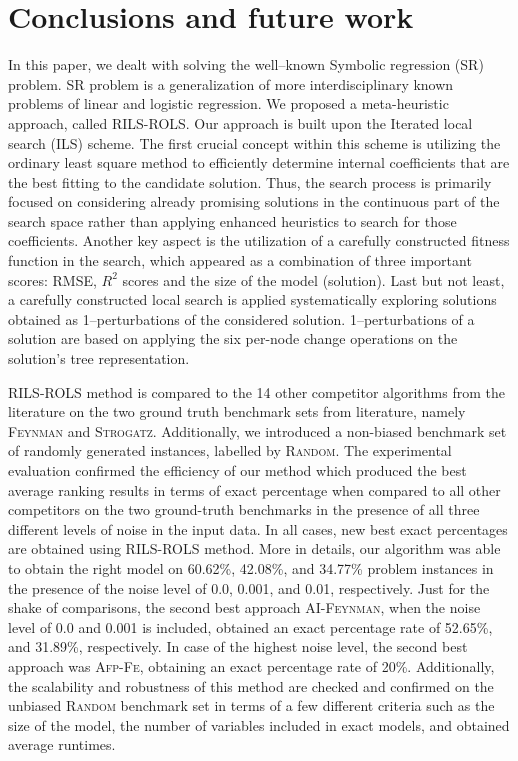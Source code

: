 \documentclass[a4paper,12pt]{elsarticle}
\begin{document}
\section{Conclusions and future work}\label{sec:conclusions}

In this paper, we dealt with solving the well--known Symbolic regression (SR)  problem. SR problem is a generalization of more interdisciplinary known problems of linear and logistic regression.    
We proposed a meta-heuristic approach, called \textsc{RILS}-\textsc{ROLS}. Our approach is built upon the Iterated local search (ILS) scheme. The first crucial concept within this scheme is utilizing the ordinary least square method to efficiently determine internal coefficients that are the best fitting to the candidate solution. Thus, the search process is primarily focused on considering already promising solutions in the continuous part of the search space rather than applying enhanced heuristics to search for those coefficients. Another key aspect is the utilization of a carefully constructed fitness function in the search, which appeared as a combination of three important scores: RMSE, $R^2$  scores and the size of the model (solution).  Last but not least, a carefully constructed local search is applied systematically exploring solutions obtained as 1--perturbations of the considered solution.  1--perturbations of a solution are based on applying the six per-node change operations on the solution's tree representation. 

\textsc{RILS-ROLS} method is compared to the 14 other competitor algorithms from the literature on the two ground truth benchmark sets from literature, namely \textsc{Feynman} and \textsc{Strogatz}.  Additionally, we introduced a non-biased benchmark set of randomly generated instances, labelled by \textsc{Random}.  The experimental evaluation confirmed the efficiency of our method which produced the best average ranking results in terms of exact percentage when compared to all other competitors on the two ground-truth benchmarks in the presence of all three different levels of noise in the input data. In all cases, new best exact percentages are obtained using \textsc{RILS-ROLS} method.   More in details,
our algorithm was able to obtain the right model on 60.62\%, 42.08\%, and 34.77\% problem instances in the presence of the noise level of 0.0, 0.001, and 0.01, respectively. Just for the shake of comparisons, the second best approach \textsc{AI-Feynman}, when the noise level of 0.0 and 0.001 is included, obtained an exact percentage rate of 52.65\%, and 31.89\%, respectively. In case of the highest noise level, the second best approach was \textsc{Afp-Fe}, obtaining an exact percentage rate of 20\%. Additionally, the scalability and robustness of this method are checked and confirmed on the unbiased \textsc{Random} benchmark set in terms of a few different criteria such as the size of the model, the number of variables included in exact models, and obtained average runtimes. 
\end{document}
